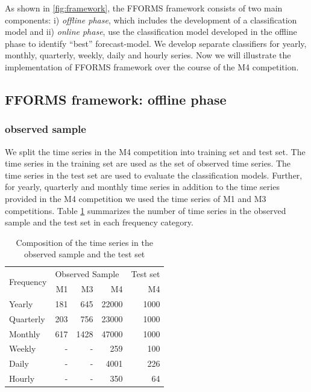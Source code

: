 \documentclass[11pt,a4paper,]{article}
\theoremstyle{definition}
\theoremstyle{definition}
\theoremstyle{definition}
\theoremstyle{remark}
\begin{document}
As shown in \autoref{fig:framework}, the FFORMS framework consists of
two main components: i) \emph{offline phase}, which includes the
development of a classification model and ii) \emph{online phase}, use
the classification model developed in the offline phase to identify
``best'' forecast-model. We develop separate classifiers for yearly,
monthly, quarterly, weekly, daily and hourly series. Now we will
illustrate the implementation of FFORMS framework over the course of the
M4 competition.

\subsection{FFORMS framework: offline
phase}\label{fforms-framework-offline-phase}

\subsubsection{observed sample}\label{observed-sample}

We split the time series in the M4 competition into training set and
test set. The time series in the training set are used as the set of
observed time series. The time series in the test set are used to
evaluate the classification models. Further, for yearly, quarterly and
monthly time series in addition to the time series provided in the M4
competition we used the time series of M1 and M3 competitions. Table
\ref{observedsample} summarizes the number of time series in the
observed sample and the test set in each frequency category.

\begin{table}[!h]
\centering
\caption{Composition of the time series in the observed sample and the test set}
\label{observedsample}
\begin{tabular}{l|rrr|r}
\multirow{2}{*}{Frequency} & \multicolumn{3}{l|}{Observed Sample} &  Test set \\ 
                  &   M1    &    M3   &    M4  &  M4 \\ \hline
  Yearly          &   181    &   645    &   22000   & 1000 \\
  Quarterly       &   203    &    756   &   23000   &  1000\\
  Monthly         &   617    &    1428   &  47000    &  1000\\
  Weekly          &   -    &   -    &   259   & 100 \\
  Daily           &   -    &   -    &   4001   & 226 \\
  Hourly          &   -    &    -   &  350    & 64\\ \hline
\end{tabular}
\end{table}
\end{document}
